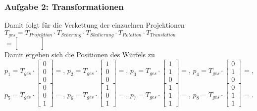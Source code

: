 \documentclass[accentcolor=tud9c,colorbacktitle,inverttitle,landscape,german,presentation,t]{tudbeamer}
\begin{document}
\begin{frame}
	\frametitle{Aufgabe 2: Transformationen}
	Damit folgt für die Verkettung der einzuelnen Projektionen\\
	$T_{ges}=T_{Projektion} \cdot T_{Scherung} \cdot T_{Skalierung} \cdot T_{Rotation} \cdot T_{Translation}$\\
	$=\begin{bmatrix}
	 &  &  & \\
	 &  &  & \\
	 &  &  & \\
	 &  &  & 
	\end{bmatrix}$\\
	Damit ergeben sich die Positionen des Würfels zu\\
	{\small 
	$p_1=T_{ges} \cdot \begin{bmatrix} 0\\0\\0\end{bmatrix}= $,
	$p_2=T_{ges} \cdot \begin{bmatrix} 1\\0\\0\end{bmatrix}= $,
	$p_3=T_{ges} \cdot \begin{bmatrix} 1\\1\\0\end{bmatrix}= $,
	$p_4=T_{ges} \cdot \begin{bmatrix} 0\\1\\0\end{bmatrix}= $,\\
	$p_5=T_{ges} \cdot \begin{bmatrix} 0\\0\\1\end{bmatrix}= $,
	$p_6=T_{ges} \cdot \begin{bmatrix} 1\\0\\1\end{bmatrix}= $,
	$p_7=T_{ges} \cdot \begin{bmatrix} 1\\1\\1\end{bmatrix}= $,
	$p_8=T_{ges} \cdot \begin{bmatrix} 0\\1\\1\end{bmatrix}= $.
}
	
\end{frame}
\end{document}
